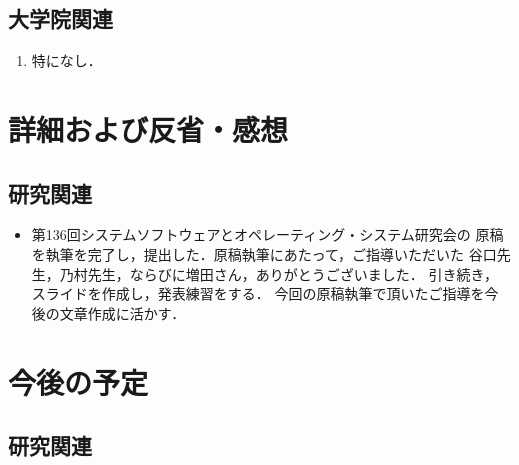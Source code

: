 \documentclass[fleqn, 14pt]{extarticle}
\begin{document}
    \subsection{大学院関連}
    \label{sec2-3}
    \begin{enumerate}

        \item 特になし．
            \hfill
            \label{enum-univ1}

    \end{enumerate}

    \section{詳細および反省・感想}
    \label{sec-3}

    \subsection{研究関連}
    \label{sec-3-2}

    \begin{itemize}

        \item[(\ref{enum-1-C})]
            \begin{spacing}{1.2}
            第136回システムソフトウェアとオペレーティング・システム研究会の
            原稿を執筆を完了し，提出した．原稿執筆にあたって，ご指導いただいた
            谷口先生，乃村先生，ならびに増田さん，ありがとうございました．
            引き続き，スライドを作成し，発表練習をする．
            今回の原稿執筆で頂いたご指導を今後の文章作成に活かす．
            \end{spacing}

    \end{itemize}

    \section{今後の予定}
    \label{sec-4}

    \subsection{研究関連}
    \label{sec-4-1}
\end{document}
